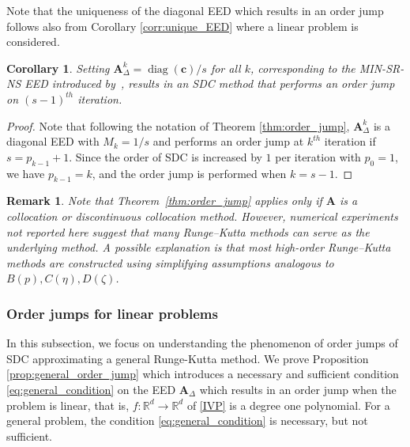\documentclass[sn-mathphys-num]{sn-jnl}%
\newcommand{\reva}[1]{#1}%
\newcommand{\revb}[1]{#1}%
\DeclareMathOperator{\diag}{diag}
\theoremstyle{thmstyleone}%
\newtheorem{corollary}{Corollary}%
\theoremstyle{thmstyletwo}%
\newtheorem{remark}{Remark}%
\theoremstyle{thmstylethree}%
\begin{document}
\revb{Note that the uniqueness of the diagonal EED which results in an order jump follows also from Corollary \ref{corr:unique_EED} where a linear problem is considered.}

\begin{corollary}
    \label{corr:MIN-SR-NS_jump}
    Setting $\bm{A}_{\Delta}^k= \diag(\bm{c})/s$ for all $k$, \reva{corresponding to the MIN-SR-NS EED} introduced by~\cite{CaklovicEtAl2025}, results in an SDC method that performs an order jump on $(s-1)^{th}$ iteration.
\end{corollary}
\begin{proof}
    \reva{Note that following the notation of Theorem \ref{thm:order_jump}, $\bm{A}_{\Delta}^k$ is a diagonal EED with $M_k = 1/s$ and performs an order jump at $k^{th}$ iteration if $s = p_{k-1} + 1$. Since the order of SDC is increased by $1$ per iteration with $p_0 = 1$, we have $p_{k-1} = k$, and the order jump is performed when $k = s - 1$.}
\end{proof}



\begin{remark}
Note that Theorem~\ref{thm:order_jump} applies only if $\bm{A}$ is a collocation \reva{or discontinuous collocation} method. 
However, numerical experiments not reported here suggest that many Runge–Kutta methods can serve as the underlying method. 
A possible explanation is that most high-order Runge–Kutta methods are constructed using simplifying assumptions analogous to $B(p), C(\eta), D(\zeta)$.
\end{remark}






\subsubsection{Order jumps for linear problems}
In this subsection, we focus on understanding the phenomenon of order jumps of SDC approximating a general Runge-Kutta method. We prove Proposition \ref{prop:general_order_jump} which introduces a necessary and sufficient condition \eqref{eq:general_condition} on the EED $\bm{A}_\Delta$ which results in an order jump when the problem is linear, that is, $f : \mathbb{R}^d \to \mathbb{R}^d$ of \eqref{IVP} is a degree one polynomial. 
For a general problem, the condition \eqref{eq:general_condition} is necessary, but not sufficient.
\end{document}
